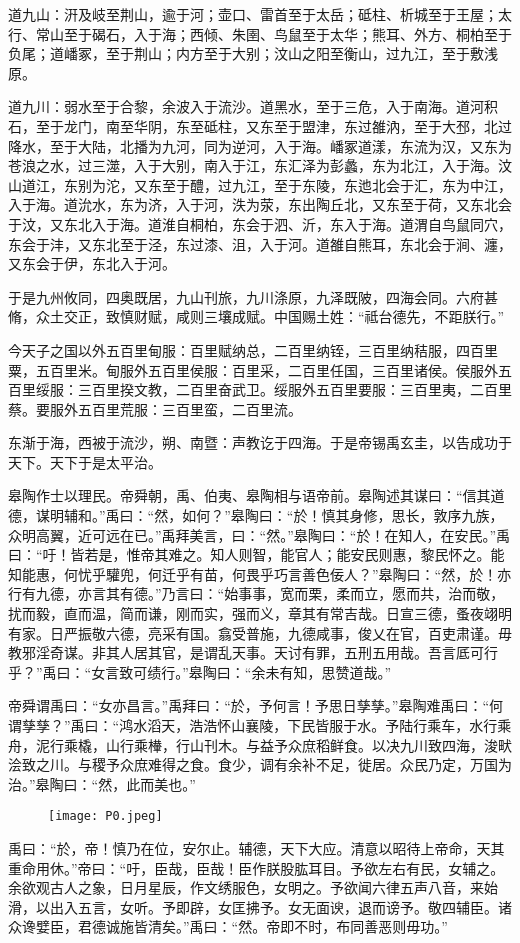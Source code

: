 \documentclass[UTF8,12pt,AutoFakeBold]{ctexart}
\begin{document}
道九山：汧及岐至荆山，逾于河；壶口、雷首至于太岳；砥柱、析城至于王屋；太行、常山至于碣石，入于海；西倾、朱圉、鸟鼠至于太华；熊耳、外方、桐柏至于负尾；道嶓冢，至于荆山；内方至于大别；汶山之阳至衡山，过九江，至于敷浅原。

道九川：弱水至于合黎，余波入于流沙。道黑水，至于三危，入于南海。道河积石，至于龙门，南至华阴，东至砥柱，又东至于盟津，东过雒汭，至于大邳，北过降水，至于大陆，北播为九河，同为逆河，入于海。嶓冢道漾，东流为汉，又东为苍浪之水，过三澨，入于大别，南入于江，东汇泽为彭蠡，东为北江，入于海。汶山道江，东别为沱，又东至于醴，过九江，至于东陵，东迆北会于汇，东为中江，入于海。道沇水，东为济，入于河，泆为荥，东出陶丘北，又东至于荷，又东北会于汶，又东北入于海。道淮自桐柏，东会于泗、沂，东入于海。道渭自鸟鼠同穴，东会于沣，又东北至于泾，东过漆、沮，入于河。道雒自熊耳，东北会于涧、瀍，又东会于伊，东北入于河。

于是九州攸同，四奥既居，九山刊旅，九川涤原，九泽既陂，四海会同。六府甚脩，众土交正，致慎财赋，咸则三壤成赋。中国赐土姓：“祗台德先，不距朕行。”

今天子之国以外五百里甸服：百里赋纳总，二百里纳铚，三百里纳秸服，四百里粟，五百里米。甸服外五百里侯服：百里采，二百里任国，三百里诸侯。侯服外五百里绥服：三百里揆文教，二百里奋武卫。绥服外五百里要服：三百里夷，二百里蔡。要服外五百里荒服：三百里蛮，二百里流。

东渐于海，西被于流沙，朔、南暨：声教讫于四海。于是帝锡禹玄圭，以告成功于天下。天下于是太平治。

皋陶作士以理民。帝舜朝，禹、伯夷、皋陶相与语帝前。皋陶述其谋曰：“信其道德，谋明辅和。”禹曰：“然，如何？”皋陶曰：“於！慎其身修，思长，敦序九族，众明高翼，近可远在已。”禹拜美言，曰：“然。”皋陶曰：“於！在知人，在安民。”禹曰：“吁！皆若是，惟帝其难之。知人则智，能官人；能安民则惠，黎民怀之。能知能惠，何忧乎驩兜，何迁乎有苗，何畏乎巧言善色佞人？”皋陶曰：“然，於！亦行有九德，亦言其有德。”乃言曰：“始事事，宽而栗，柔而立，愿而共，治而敬，扰而毅，直而温，简而谦，刚而实，强而义，章其有常吉哉。日宣三德，蚤夜翊明有家。日严振敬六德，亮采有国。翕受普施，九德咸事，俊乂在官，百吏肃谨。毋教邪淫奇谋。非其人居其官，是谓乱天事。天讨有罪，五刑五用哉。吾言厎可行乎？”禹曰：“女言致可绩行。”皋陶曰：“余未有知，思赞道哉。”

帝舜谓禹曰：“女亦昌言。”禹拜曰：“於，予何言！予思日孳孳。”皋陶难禹曰：“何谓孳孳？”禹曰：“鸿水滔天，浩浩怀山襄陵，下民皆服于水。予陆行乘车，水行乘舟，泥行乘橇，山行乘檋，行山刊木。与益予众庶稻鲜食。以决九川致四海，浚畎浍致之川。与稷予众庶难得之食。食少，调有余补不足，徙居。众民乃定，万国为治。”皋陶曰：“然，此而美也。”
\begin{figure}[htbp]
    \centering
    \texttt{[image: P0.jpeg]}
    \captionsetup{font=footnotesize}
    \label{图：CV}
\end{figure}
禹曰：“於，帝！慎乃在位，安尔止。辅德，天下大应。清意以昭待上帝命，天其重命用休。”帝曰：“吁，臣哉，臣哉！臣作朕股肱耳目。予欲左右有民，女辅之。余欲观古人之象，日月星辰，作文绣服色，女明之。予欲闻六律五声八音，来始滑，以出入五言，女听。予即辟，女匡拂予。女无面谀，退而谤予。敬四辅臣。诸众谗嬖臣，君德诚施皆清矣。”禹曰：“然。帝即不时，布同善恶则毋功。”
\end{document}

